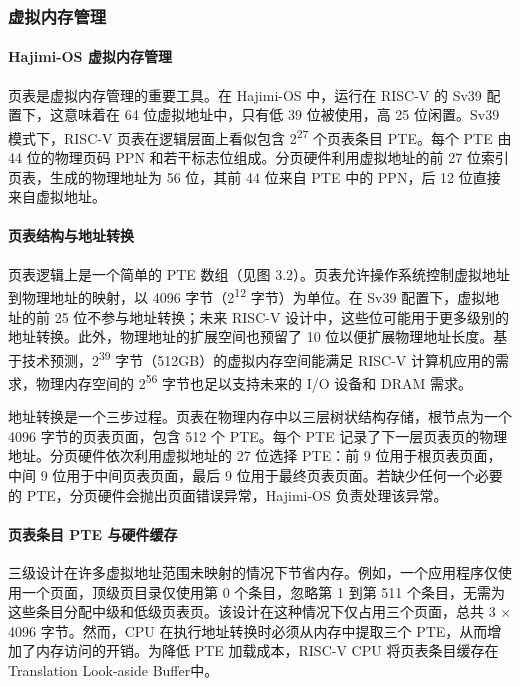 \documentclass[UTF8]{article}
\begin{document}
\subsubsection{虚拟内存管理}

\paragraph{Hajimi-OS 虚拟内存管理\\}
页表是虚拟内存管理的重要工具。在 Hajimi-OS 中，运行在 RISC-V 的 Sv39 配置下，这意味着在 64 位虚拟地址中，只有低 39 位被使用，高 25 位闲置。Sv39 模式下，RISC-V 页表在逻辑层面上看似包含 2\textsuperscript{27} 个页表条目 PTE。每个 PTE 由 44 位的物理页码 PPN 和若干标志位组成。分页硬件利用虚拟地址的前 27 位索引页表，生成的物理地址为 56 位，其前 44 位来自 PTE 中的 PPN，后 12 位直接来自虚拟地址。

\paragraph{页表结构与地址转换\\}
页表逻辑上是一个简单的 PTE 数组（见图 3.2）。页表允许操作系统控制虚拟地址到物理地址的映射，以 4096 字节（2\textsuperscript{12} 字节）为单位。在 Sv39 配置下，虚拟地址的前 25 位不参与地址转换；未来 RISC-V 设计中，这些位可能用于更多级别的地址转换。此外，物理地址的扩展空间也预留了 10 位以便扩展物理地址长度。基于技术预测，2\textsuperscript{39} 字节（512GB）的虚拟内存空间能满足 RISC-V 计算机应用的需求，物理内存空间的 2\textsuperscript{56} 字节也足以支持未来的 I/O 设备和 DRAM 需求。

地址转换是一个三步过程。页表在物理内存中以三层树状结构存储，根节点为一个 4096 字节的页表页面，包含 512 个 PTE。每个 PTE 记录了下一层页表页的物理地址。分页硬件依次利用虚拟地址的 27 位选择 PTE：前 9 位用于根页表页面，中间 9 位用于中间页表页面，最后 9 位用于最终页表页面。若缺少任何一个必要的 PTE，分页硬件会抛出页面错误异常，Hajimi-OS 负责处理该异常。

\paragraph{页表条目 PTE 与硬件缓存\\}
三级设计在许多虚拟地址范围未映射的情况下节省内存。例如，一个应用程序仅使用一个页面，顶级页目录仅使用第 0 个条目，忽略第 1 到第 511 个条目，无需为这些条目分配中级和低级页表页。该设计在这种情况下仅占用三个页面，总共 3 × 4096 字节。然而，CPU 在执行地址转换时必须从内存中提取三个 PTE，从而增加了内存访问的开销。为降低 PTE 加载成本，RISC-V CPU 将页表条目缓存在 Translation Look-aside Buffer中。
\end{document}
